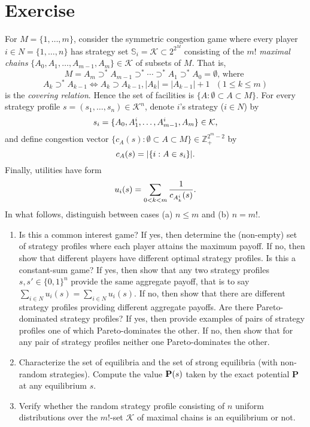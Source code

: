 \documentclass{article}
\begin{document}
\section{Exercise}
For $M=\{1,\ldots,m\}$, consider the symmetric congestion game where every player $i\in N=\{1,\ldots,n\}$ has strategy set $\mathbb S_i=\mathcal K\subset 2^{2^M}$
consisting of the $m!$ \textit{maximal chains} $\{A_0,A_1,\ldots,A_{m-1},A_m\}\in\mathcal K$ of subsets of $M$. That is,
$$M=A_m\supset^*A_{m-1}\supset^*\cdots\supset^*A_1\supset^*A_0=\emptyset\text{, where }$$
$$A_k\supset^*A_{k-1}\Leftrightarrow A_k\supset A_{k-1},|A_k|=|A_{k-1}|+1\text{ }(1\leq k\leq m)$$
is the \textit{covering relation}. Hence the set of facilities is $\{A:\emptyset\subset A\subset M\}$. For every strategy profile $s=(s_1,\ldots,s_n)\in\mathcal K^n$,
denote $i$'s strategy ($i\in N$) by
$$s_i=\{A_0,A_1^i,\ldots,A_{m-1}^i,A_m\}\in\mathcal K\text ,$$
and define congestion vector $\{c_A(s):\emptyset\subset A\subset M\}\in\mathbb Z_+^{2^m-2}$ by
$$c_A(s)=|\{i:A\in s_i\}|\text .$$
Finally, utilities have form
$$u_i(s)=\sum_{0<k<m}\frac{1}{c_{A^i_k}(s)}\text .$$
In what follows, distinguish between cases (a) $n\leq m$ and (b) $n=m!$.
\begin{enumerate}
\item Is this a common interest game? If yes, then determine the (non-empty) set of strategy profiles where each player attains the maximum payoff. If no, then show
that different players have different optimal strategy profiles. Is this a constant-sum game? If yes, then show that any two strategy profiles $s,s'\in\{0,1\}^n$
provide the same aggregate payoff, that is to say $\sum_{i\in N}u_i(s)=\sum_{i\in N}u_i(s)$. If no, then show that there are different strategy profiles providing
different aggregate payoffs. Are there Pareto-dominated strategy profiles? If yes, then provide examples of pairs of strategy profiles one of which Pareto-dominates the
other. If no, then show that for any pair of strategy profiles neither one Pareto-dominates the other.
\item Characterize the set of equilibria and the set of strong equilibria (with non-random strategies). Compute the value $\textbf P(s)$ taken by the exact potential
\textbf P at any equilibrium $s$.
\item Verify whether the random strategy profile consisting of $n$ uniform distributions over the $m!$-set $\mathcal K$ of maximal chains is an equilibrium or not.
\end{enumerate}
\end{document}
